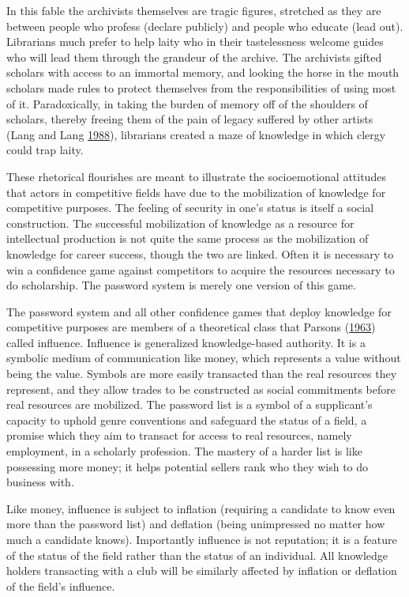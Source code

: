 \documentclass[]{book}
\theoremstyle{definition}
\theoremstyle{definition}
\theoremstyle{definition}
\theoremstyle{remark}
\begin{document}
In this fable the archivists themselves are tragic figures, stretched as
they are between people who profess (declare publicly) and people who
educate (lead out). Librarians much prefer to help laity who in their
tastelessness welcome guides who will lead them through the grandeur of
the archive. The archivists gifted scholars with access to an immortal
memory, and looking the horse in the mouth scholars made rules to
protect themselves from the responsibilities of using most of it.
Paradoxically, in taking the burden of memory off of the shoulders of
scholars, thereby freeing them of the pain of legacy suffered by other
artists (Lang and Lang
\protect\hyperlink{ref-Lang1988Recognition}{1988}), librarians created a
maze of knowledge in which clergy could trap laity.

These rhetorical flourishes are meant to illustrate the socioemotional
attitudes that actors in competitive fields have due to the mobilization
of knowledge for competitive purposes. The feeling of security in one's
status is itself a social construction. The successful mobilization of
knowledge as a resource for intellectual production is not quite the
same process as the mobilization of knowledge for career success, though
the two are linked. Often it is necessary to win a confidence game
against competitors to acquire the resources necessary to do
scholarship. The password system is merely one version of this game.

The password system and all other confidence games that deploy knowledge
for competitive purposes are members of a theoretical class that Parsons
(\protect\hyperlink{ref-Parsons1963Concept}{1963}) called influence.
Influence is generalized knowledge-based authority. It is a symbolic
medium of communication like money, which represents a value without
being the value. Symbols are more easily transacted than the real
resources they represent, and they allow trades to be constructed as
social commitments before real resources are mobilized. The password
list is a symbol of a supplicant's capacity to uphold genre conventions
and safeguard the status of a field, a promise which they aim to
transact for access to real resources, namely employment, in a scholarly
profession. The mastery of a harder list is like possessing more money;
it helps potential sellers rank who they wish to do business with.

Like money, influence is subject to inflation (requiring a candidate to
know even more than the password list) and deflation (being unimpressed
no matter how much a candidate knows). Importantly influence is not
reputation; it is a feature of the status of the field rather than the
status of an individual. All knowledge holders transacting with a club
will be similarly affected by inflation or deflation of the field's
influence.
\end{document}
